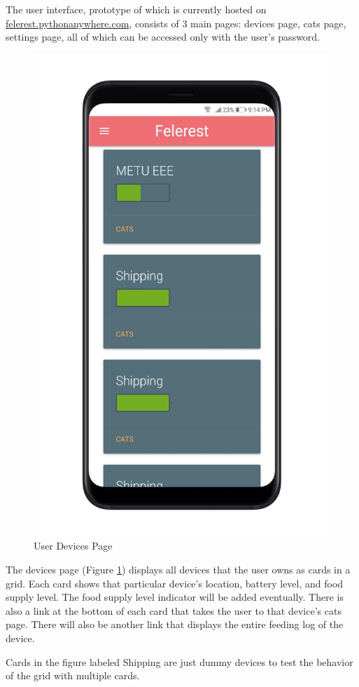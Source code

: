 The user interface, prototype of which is currently hosted on \\ \href{https://felerest.pythonanywhere.com/}{felerest.pythonanywhere.com}, consists of 3 main pages: devices page, cats page, settings page, all of which can be accessed only with the user's password.

\clearpage

\begin{figure}[ht] 
     \centering
     \includegraphics[width=.55\linewidth]{content/030_system_architecture/img/user_interface/devices.jpeg}
     \caption{User Devices Page}
     \label{fig:ui-devices}
\end{figure}

The devices page (Figure \ref{fig:ui-devices}) displays all devices that the user owns as cards in a grid. Each card shows that particular device's location, battery level, and food supply level. The food supply level indicator will be added eventually. There is also a link at the bottom of each card that takes the user to that device's cats page. There will also be another link that displays the entire feeding log of the device.

Cards in the figure labeled Shipping are just dummy devices to test the behavior of the grid with multiple cards.


